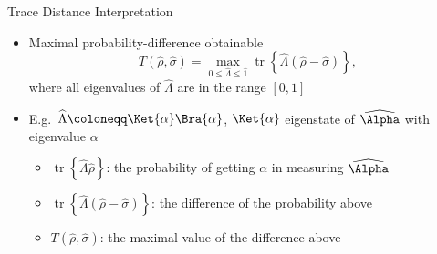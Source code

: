 \documentclass{beamer}
\newcommand{\rbr}[1]{{\left(#1\right)}}
\newcommand{\sbr}[1]{{\left[#1\right]}}
\newcommand{\vbr}[1]{{\left|#1\right|}}
\newcommand{\rfun}[2]{{#1}\mathopen{}\left(#2\right)\mathclose{}}
\newcommand{\cfun}[2]{{#1}\mathopen{}\left\{#2\right\}\mathclose{}}
\newcommand{\what}[1]{{\widehat{#1}}}
\DeclareMathOperator{\tr}{tr}
\begin{document}
\begin{frame}{Trace Distance \cite[ch.~9]{Wilde2009}}{Interpretation}
\begin{itemize}
\item Maximal probability-difference obtainable
\begin{equation}
\rfun{T}{\what{\rho}, \what{\sigma}} = \max_{0 \le \what{\Lambda} \le \what{1}}
\cfun{\tr}{\what{\Lambda}\rbr{\what{\rho}-\what{\sigma}}},
\end{equation}
where all eigenvalues of $\what{\Lambda}$ are in the range $\sbr{0,1}$
\item E.g.\ $\what{\Lambda} \coloneqq \Ket{\alpha}\Bra{\alpha}$, $\Ket{\alpha}$
eigenstate of $\what{\Alpha}$ with eigenvalue $\alpha$
\begin{itemize}
\item $\cfun{\tr}{\what{\Lambda}\what{\rho}}$: the probability of getting
$\alpha$ in measuring $\what{\Alpha}$
\item $\cfun{\tr}{\what{\Lambda}\rbr{\what{\rho}-\what{\sigma}}}$: the
difference of the probability above
\item $\rfun{T}{\what{\rho}, \what{\sigma}}$: the maximal value of the 
difference above
\end{itemize}
\end{itemize}

\end{frame}








\end{document}

